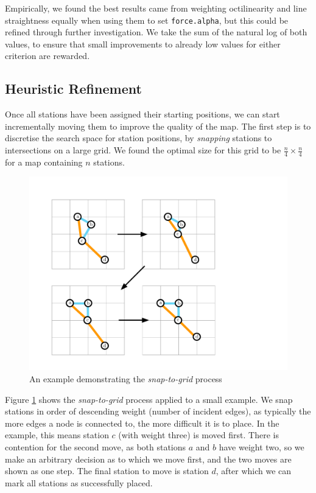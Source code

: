 Empirically, we found the best results came from weighting octilinearity and line straightness equally when using them to set \texttt{force.alpha}, but this could be refined through further investigation. We take the sum of the natural log of both values, to ensure that small improvements to already low values for either criterion are rewarded.

\subsection{Heuristic Refinement}

Once all stations have been assigned their starting positions, we can start incrementally moving them to improve the quality of the map. The first step is to discretise the search space for station positions, by \textit{snapping} stations to intersections on a large grid. We found the optimal size for this grid to be $\frac{n}{4}\times\frac{n}{4}$ for a map containing $n$ stations. 
\begin{figure}[htbp!]
	\centering
	\includegraphics[width=.9\textwidth]{img/implementation/snap.pdf}
	\caption{An example demonstrating the \textit{snap-to-grid} process}
	\label{fig:snap}
\end{figure}

Figure \ref{fig:snap} shows the \textit{snap-to-grid} process applied to a small example. We snap stations in order of descending weight (number of incident edges), as typically the more edges a node is connected to, the more difficult it is to place. In the example, this means station $c$ (with weight three) is moved first. There is contention for the second move, as both stations $a$ and $b$ have weight two, so we make an arbitrary decision as to which we move first, and the two moves are shown as one step. The final station to move is station $d$, after which we can mark all stations as successfully placed. 

